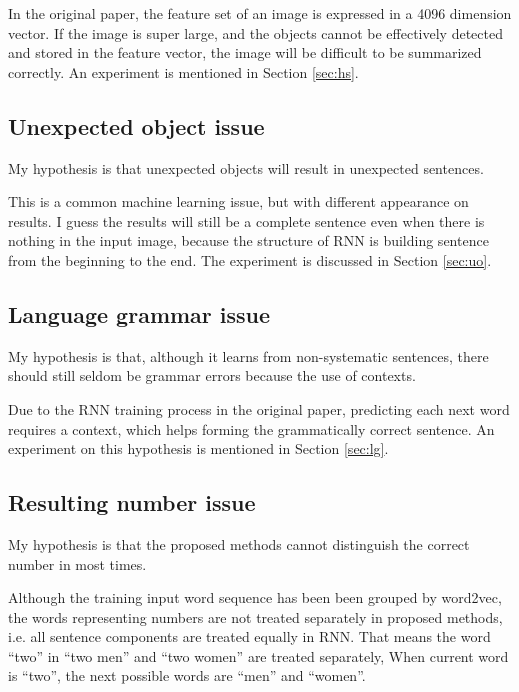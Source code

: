 \documentclass[10pt,twocolumn,letterpaper]{article}
\begin{document}
In the original paper, the feature set of an image is expressed in a 4096 dimension vector.
If the image is super large, and the objects cannot be effectively detected and stored in the feature vector,
the image will be difficult to be summarized correctly. An experiment is mentioned in Section \ref{sec:hs}.


\subsection{Unexpected object issue}
My hypothesis is that unexpected objects will result in unexpected sentences.

This is a common machine learning issue, but with different appearance on results.
I guess the results will still be a complete sentence even when there is nothing in the input image,
because the structure of RNN is building sentence from the beginning to the end.
The experiment is discussed in Section \ref{sec:uo}.


\subsection{Language grammar issue}

My hypothesis is that, although it learns from non-systematic sentences,
there should still seldom be grammar errors because the use of contexts.

Due to the RNN training process in the original paper, predicting each next word requires a context,
which helps forming the grammatically correct sentence.
An experiment on this hypothesis is mentioned in Section \ref{sec:lg}.


\subsection{Resulting number issue}
My hypothesis is that the proposed methods cannot distinguish the correct number in most times.

Although the training input word sequence has been been grouped by word2vec,
the words representing numbers are not treated separately in proposed methods,
i.e. all sentence components are treated equally in RNN.
That means the word ``two'' in ``two men'' and ``two women'' are treated separately,
When current word is ``two'', the next possible words are ``men'' and ``women''.
\end{document}
